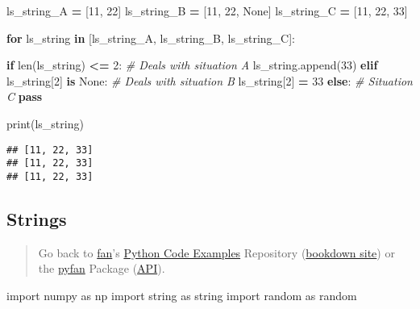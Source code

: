 \documentclass[
]{book}
\newenvironment{Shaded}{\begin{snugshade}}{\end{snugshade}}
\newcommand{\BuiltInTok}[1]{#1}
\newcommand{\CommentTok}[1]{\textcolor[rgb]{0.56,0.35,0.01}{\textit{#1}}}
\newcommand{\ControlFlowTok}[1]{\textcolor[rgb]{0.13,0.29,0.53}{\textbf{#1}}}
\newcommand{\DecValTok}[1]{\textcolor[rgb]{0.00,0.00,0.81}{#1}}
\newcommand{\ImportTok}[1]{#1}
\newcommand{\KeywordTok}[1]{\textcolor[rgb]{0.13,0.29,0.53}{\textbf{#1}}}
\newcommand{\NormalTok}[1]{#1}
\newcommand{\OperatorTok}[1]{\textcolor[rgb]{0.81,0.36,0.00}{\textbf{#1}}}
\newcommand{\VariableTok}[1]{\textcolor[rgb]{0.00,0.00,0.00}{#1}}
\begin{document}
\begin{Shaded}
\begin{Highlighting}[]

\NormalTok{ls\_string\_A }\OperatorTok{=}\NormalTok{ [}\DecValTok{11}\NormalTok{, }\DecValTok{22}\NormalTok{]}
\NormalTok{ls\_string\_B }\OperatorTok{=}\NormalTok{ [}\DecValTok{11}\NormalTok{, }\DecValTok{22}\NormalTok{, }\VariableTok{None}\NormalTok{]}
\NormalTok{ls\_string\_C }\OperatorTok{=}\NormalTok{ [}\DecValTok{11}\NormalTok{, }\DecValTok{22}\NormalTok{, }\DecValTok{33}\NormalTok{]}

\ControlFlowTok{for}\NormalTok{ ls\_string }\KeywordTok{in}\NormalTok{ [ls\_string\_A, ls\_string\_B, ls\_string\_C]:}

  \ControlFlowTok{if} \BuiltInTok{len}\NormalTok{(ls\_string) }\OperatorTok{\textless{}=} \DecValTok{2}\NormalTok{:}
    \CommentTok{\# Deals with situation A}
\NormalTok{    ls\_string.append(}\DecValTok{33}\NormalTok{)}
  \ControlFlowTok{elif}\NormalTok{ ls\_string[}\DecValTok{2}\NormalTok{] }\KeywordTok{is} \VariableTok{None}\NormalTok{:}
    \CommentTok{\# Deals with situation B}
\NormalTok{    ls\_string[}\DecValTok{2}\NormalTok{] }\OperatorTok{=} \DecValTok{33}
  \ControlFlowTok{else}\NormalTok{:}
    \CommentTok{\# Situation C}
    \ControlFlowTok{pass}

  \BuiltInTok{print}\NormalTok{(ls\_string)}
\end{Highlighting}
\end{Shaded}

\begin{verbatim}
## [11, 22, 33]
## [11, 22, 33]
## [11, 22, 33]
\end{verbatim}

\hypertarget{strings}{%
\subsection{Strings}\label{strings}}

\begin{quote}
Go back to \href{http://fanwangecon.github.io/}{fan}'s \href{https://fanwangecon.github.io/Py4Econ/}{Python Code Examples} Repository (\href{https://fanwangecon.github.io/Py4Econ/bookdown}{bookdown site}) or the \href{https://pyfan.readthedocs.io/en/latest/}{pyfan} Package (\href{https://pyfan.readthedocs.io/en/latest/reference.html}{API}).
\end{quote}

\begin{Shaded}
\begin{Highlighting}[]
\ImportTok{import}\NormalTok{ numpy }\ImportTok{as}\NormalTok{ np}
\ImportTok{import}\NormalTok{ string }\ImportTok{as}\NormalTok{ string}
\ImportTok{import}\NormalTok{ random }\ImportTok{as}\NormalTok{ random}
\end{Highlighting}
\end{Shaded}
\end{document}
